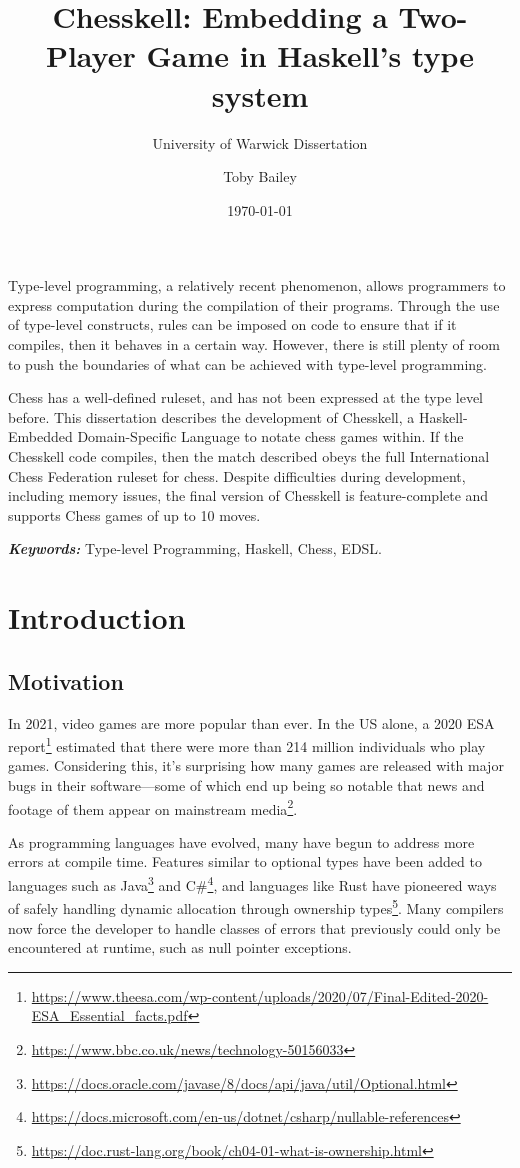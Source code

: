 \documentclass[12pt, a4paper, bibliography=totocnumbered]{scrreprt}
\title{Chesskell: Embedding a Two-Player Game in Haskell's type system}
\subtitle{University of Warwick Dissertation}
\author{Toby Bailey}
\date{\today}
\renewenvironment{abstract}
 {\small
  \begin{center}
  \bfseries \textit{\abstractname}\vspace{-.5em}\vspace{0pt}
  \end{center}
  \quotation}
 {\endquotation}
\begin{document}
\begin{titlepage}
    \maketitle
    \tableofcontents
\end{titlepage}

\begin{abstract}
    Type-level programming, a relatively recent phenomenon, allows programmers to express computation during the compilation of their programs. Through the use of type-level constructs, rules can be imposed on code to ensure that if it compiles, then it behaves in a certain way. However, there is still plenty of room to push the boundaries of what can be achieved with type-level programming.

    Chess has a well-defined ruleset, and has not been expressed at the type level before. This dissertation describes the development of Chesskell, a Haskell-Embedded Domain-Specific Language to notate chess games within. If the Chesskell code compiles, then the match described obeys the full International Chess Federation ruleset for chess. Despite difficulties during development, including memory issues, the final version of Chesskell is feature-complete and supports Chess games of up to 10 moves.

    \textbf{\textit{Keywords:}} Type-level Programming, Haskell, Chess, EDSL.
\end{abstract}

\part{Introduction}

\chapter{Motivation}

In 2021, video games are more popular than ever. In the US alone, a 2020 ESA report\footnote{\url{https://www.theesa.com/wp-content/uploads/2020/07/Final-Edited-2020-ESA_Essential_facts.pdf}} estimated that there were more than 214 million individuals who play games. Considering this, it's surprising how many games are released with major bugs in their software---some of which end up being so notable that news and footage of them appear on mainstream media\footnote{\url{https://www.bbc.co.uk/news/technology-50156033}}.

As programming languages have evolved, many have begun to address more errors at compile time. Features similar to optional types have been added to languages such as Java\footnote{\url{https://docs.oracle.com/javase/8/docs/api/java/util/Optional.html}} and C\#\footnote{\url{https://docs.microsoft.com/en-us/dotnet/csharp/nullable-references}}, and languages like Rust have pioneered ways of safely handling dynamic allocation through ownership types\footnote{\url{https://doc.rust-lang.org/book/ch04-01-what-is-ownership.html}}. Many compilers now force the developer to handle classes of errors that previously could only be encountered at runtime, such as null pointer exceptions.
\end{document}
